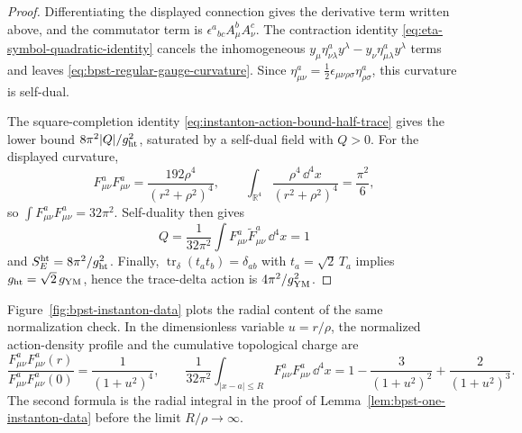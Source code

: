 \begin{proof}
Differentiating the displayed connection gives the derivative term written
above, and the commutator term is
\(\epsilon^a{}_{bc}A_\mu^bA_\nu^c\).  The contraction identity
\eqref{eq:eta-symbol-quadratic-identity} cancels the inhomogeneous
\(y_\mu\eta_{\nu\lambda}^a y^\lambda
-y_\nu\eta_{\mu\lambda}^a y^\lambda\) terms and leaves
\eqref{eq:bpst-regular-gauge-curvature}.  Since
\(\eta^a_{\mu\nu}
=\frac12\epsilon_{\mu\nu\rho\sigma}\eta^a_{\rho\sigma}\), this curvature is
self-dual.

The square-completion identity
\eqref{eq:instanton-action-bound-half-trace} gives the lower bound
\(8\pi^2|Q|/g_{\rm ht}^2\), saturated by a self-dual field with \(Q>0\).
For the displayed curvature,
\[
  F^a_{\mu\nu}F^a_{\mu\nu}
  =
  \frac{192\rho^4}{(r^2+\rho^2)^4},
  \qquad
  \int_{\mathbb R^4}
  \frac{\rho^4\,\dd^4x}{(r^2+\rho^2)^4}
  =
  \frac{\pi^2}{6},
\]
so \(\int F^a_{\mu\nu}F^a_{\mu\nu}=32\pi^2\).  Self-duality then gives
\[
  Q=\frac1{32\pi^2}\int F^a_{\mu\nu}\widetilde F^a_{\mu\nu}\,\dd^4x=1
\]
and \(S_E^{\rm ht}=8\pi^2/g_{\rm ht}^2\).  Finally,
\(\operatorname{tr}_\delta(t_at_b)=\delta_{ab}\) with
\(t_a=\sqrt2\,T_a\) implies \(g_{\rm ht}=\sqrt2\,g_{\rm YM}\), hence the
trace-delta action is \(4\pi^2/g_{\rm YM}^2\).
\end{proof}

Figure~\ref{fig:bpst-instanton-data} plots the radial content of the same
normalization check.  In the dimensionless variable \(u=r/\rho\), the
normalized action-density profile and the cumulative topological charge are
\[
  \frac{F^a_{\mu\nu}F^a_{\mu\nu}(r)}
       {F^a_{\mu\nu}F^a_{\mu\nu}(0)}
  =
  \frac1{(1+u^2)^4},
  \qquad
  \frac1{32\pi^2}\int_{|x-a|\le R}
  F^a_{\mu\nu}F^a_{\mu\nu}\,\dd^4x
  =
  1-\frac3{(1+u^2)^2}+\frac2{(1+u^2)^3}.
\]
The second formula is the radial integral in the proof of
Lemma~\ref{lem:bpst-one-instanton-data} before the limit
\(R/\rho\to\infty\).

